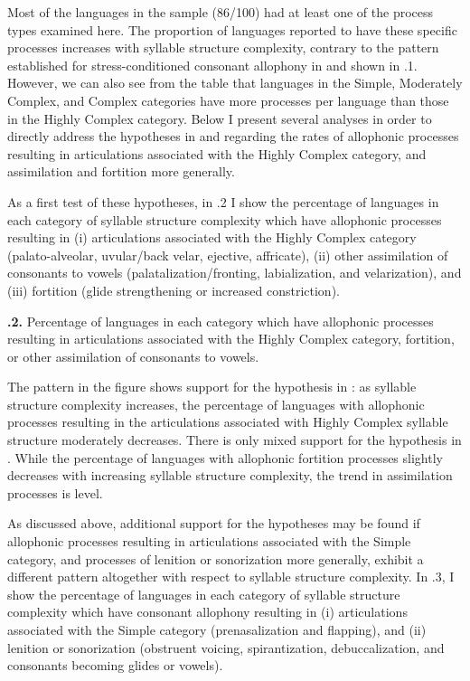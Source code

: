 Most of the languages in the sample (86/100) had at least one of the process types examined here. The proportion of languages reported to have these specific processes increases with syllable structure complexity, contrary to the pattern established for stress-conditioned consonant allophony in  and shown in .1. However, we can also see from the table that languages in the Simple, Moderately Complex, and Complex categories have more processes per language than those in the Highly Complex category. Below I present several analyses in order to directly address the hypotheses in  and  regarding the rates of allophonic processes resulting in articulations associated with the Highly Complex category, and assimilation and fortition more generally.

  As a first test of these hypotheses, in .2 I show the percentage of languages in each category of syllable structure complexity which have allophonic processes resulting in (i) articulations associated with the Highly Complex category (palato-alveolar, uvular/back velar, ejective, affricate), (ii) other assimilation of consonants to vowels (palatalization/fronting, labialization, and velarization), and (iii) fortition (glide strengthening or increased constriction).

\textbf{.2.} Percentage of languages in each category which have allophonic processes resulting in articulations associated with the Highly Complex category, fortition, or other assimilation of consonants to vowels.

  The pattern in the figure shows support for the hypothesis in : as syllable structure complexity increases, the percentage of languages with allophonic processes resulting in the articulations associated with Highly Complex syllable structure moderately decreases. There is only mixed support for the hypothesis in . While the percentage of languages with allophonic fortition processes slightly decreases with increasing syllable structure complexity, the trend in assimilation processes is level.

  As discussed above, additional support for the hypotheses may be found if allophonic processes resulting in articulations associated with the Simple category, and processes of lenition or sonorization more generally, exhibit a different pattern altogether with respect to syllable structure complexity. In .3, I show the percentage of languages in each category of syllable structure complexity which have consonant allophony resulting in (i) articulations associated with the Simple category (prenasalization and flapping), and (ii) lenition or sonorization (obstruent voicing, spirantization, debuccalization, and consonants becoming glides or vowels).

